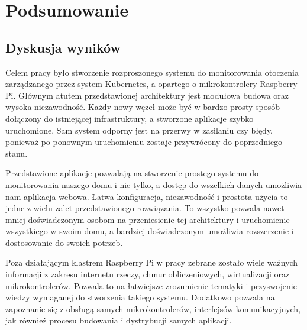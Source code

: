 \documentclass[12pt]{report}
\let\Oldsection\section
\renewcommand{\section}{\FloatBarrier\Oldsection}
\begin{document}
{\chapter{Podsumowanie}
\section{Dyskusja wyników}
Celem pracy było stworzenie rozproszonego systemu do monitorowania otoczenia zarządzanego przez system Kubernetes, a opartego o mikrokontrolery Raspberry Pi. Głównym atutem przedstawionej architektury jest modułowa budowa oraz wysoka niezawodność. Każdy nowy węzeł może być w bardzo prosty sposób dołączony do istniejącej infrastruktury, a stworzone aplikacje szybko uruchomione. Sam system odporny jest na przerwy w zasilaniu czy błędy, ponieważ po ponownym uruchomieniu zostaje przywrócony do poprzedniego stanu.

Przedstawione aplikacje pozwalają na stworzenie prostego systemu do monitorowania naszego domu i nie tylko, a dostęp do wszelkich danych umożliwia nam aplikacja webowa. Łatwa konfiguracja, niezawodność i prostota użycia to jedne z wielu zalet przedstawionego rozwiązania. To wszystko pozwala nawet mniej doświadczonym osobom na przeniesienie tej architektury i uruchomienie wszystkiego w swoim domu, a bardziej doświadczonym umożliwia rozszerzenie i dostosowanie do swoich potrzeb.

Poza działającym klastrem Raspberry Pi w pracy zebrane zostało wiele ważnych informacji z zakresu internetu rzeczy, chmur obliczeniowych, wirtualizacji oraz mikrokontrolerów. Pozwala to na łatwiejsze zrozumienie tematyki i przyswojenie wiedzy wymaganej do stworzenia takiego systemu. Dodatkowo pozwala na zapoznanie się z obsługą samych mikrokontrolerów, interfejsów komunikacyjnych, jak również procesu budowania i dystrybucji samych aplikacji.

}
\end{document}
